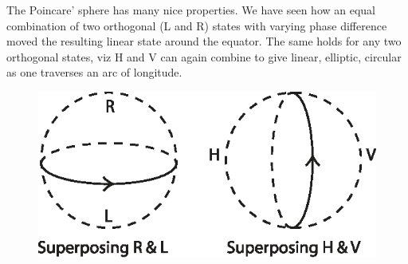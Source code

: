 \medskip

The Poincare' sphere has many nice properties. We have seen how an equal
combination of two orthogonal (L and R) states with varying phase difference
moved the resulting linear state around the equator. The same holds for any
two orthogonal states, viz H and V can again combine to give linear, elliptic,
circular as one traverses an arc of longitude.
\begin{figure}[H]
\centering
\includegraphics[scale=0.6]{src/images/chap26/9.eps}
\end{figure}

